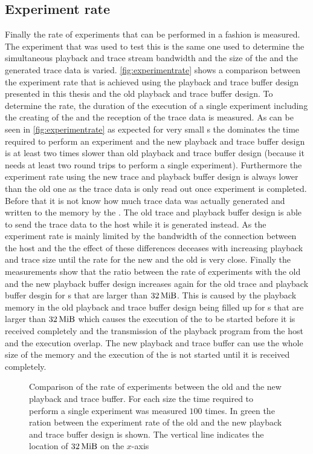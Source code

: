 \subsection{Experiment rate}
Finally the rate of experiments that can be performed in a \HWinTheLoop{} fashion is measured. The experiment that was used to test this is the same one used to determine the simultaneous playback and trace stream bandwidth and the size of the \PlaybackProgram{} and the generated trace data is varied. \autoref{fig:experimentrate} shows a comparison between the experiment rate that is achieved using the playback and trace buffer design presented in this thesis and the old playback and trace buffer design. To determine the rate, the duration of the execution of a single experiment including the creating of the \PlaybackProgram{} and the reception of the trace data is measured. As can be seen in \autoref{fig:experimentrate} as expected for very small \PlaybackProgram{}s the \rtt{} dominates the time required to perform an experiment and the new playback and trace buffer design is at least two times slower than old playback and trace buffer design (because it needs at least two round trips to perform a single experiment). Furthermore the experiment rate using the new trace and playback buffer design is always lower than the old one as the trace data is only read out once experiment is completed. Before that it is not know how much trace data was actually generated and written to the \DDR{} memory by the \AXIDMA{}. The old trace and playback buffer design is able to send the trace data to the host while it is generated instead. As the experiment rate is mainly limited by the bandwidth of the connection between the host and the \FPGA{} the effect of these differences deceases with increasing playback and trace size until the rate for the new and the old is very close.
Finally the measurements show that the ratio between the rate of experiments with the old and the new playback buffer design increases again for the old trace and playback buffer desgin for \PlaybackProgram{}s that are larger than $\SI{32}{\mebi\byte}$. This is caused by the playback memory in the old playback and trace buffer design being filled up for \PlaybackProgram{}s that are larger than $\SI{32}{\mebi\byte}$ which causes the execution of the \PlaybackProgram{} to be started before it is received completely and the transmission of the playback program from the host and the execution overlap. The new playback and trace buffer can use the whole size of the \DDR{} memory and the execution of the \PlaybackProgram{} is not started until it is received completely.
\begin{figure}[H]
\caption{Comparison of the rate of experiments between the old and the new playback and trace buffer. For each size the time required to perform a single experiment was measured $\num{100}$ times. In green the ration between the experiment rate of the old and the new playback and trace buffer design is shown. The vertical line indicates the location of $\SI{32}{\mebi\byte}$ on the $x$-axis}\label{fig:experimentrate}
\end{figure}

